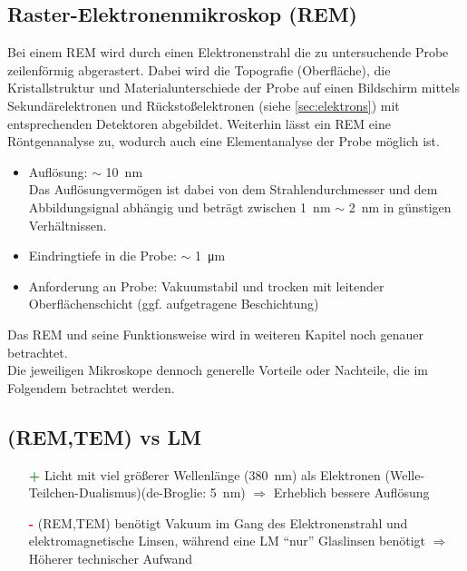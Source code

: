 \subsection*{Raster-Elektronenmikroskop (REM)}
Bei einem REM wird durch einen Elektronenstrahl die zu untersuchende Probe zeilenförmig abgerastert. Dabei wird die Topografie (Oberfläche), die Kristallstruktur und Materialunterschiede der Probe auf einen Bildschirm mittels Sekundärelektronen und Rückstoßelektronen (siehe \ref{sec:elektrons}) mit entsprechenden Detektoren abgebildet. Weiterhin lässt ein REM eine Röntgenanalyse zu, wodurch auch eine Elementanalyse der Probe möglich ist.
\begin{itemize}
    \item Auflösung: $\sim$ \SI{10}{\nano\metre}\\
    Das Auflösungvermögen ist dabei von dem Strahlendurchmesser und dem Abbildungsignal abhängig und beträgt zwischen \SI{1}{\nano\metre} $\sim$ \SI{2}{\nano\metre} in günstigen Verhältnissen. \citep{WikiREM}
    \item Eindringtiefe in die Probe: $\sim$ \SI{1}{\micro\metre}
    \item Anforderung an Probe: Vakuumstabil und trocken mit leitender Oberflächenschicht (ggf. aufgetragene Beschichtung)
\end{itemize}
Das REM und seine Funktionsweise wird in weiteren Kapitel noch genauer betrachtet.\\

Die jeweiligen Mikroskope dennoch generelle Vorteile oder Nachteile, die im Folgendem betrachtet werden.
\subsection*{(REM,TEM) vs LM}
\begin{itemize}
    \item[\textcolor{green}{\textbf{+}}] Licht mit viel größerer Wellenlänge (\SI{380}{\nano\metre}) als Elektronen (Welle-Teilchen-Dualismus)(de-Broglie: \SI{5}{\nano\metre}) $\Rightarrow$ Erheblich bessere Auflösung
    \item[\textcolor{red}{\textbf{-}}] (REM,TEM) benötigt Vakuum im Gang des Elektronenstrahl und elektromagnetische Linsen, während eine LM \enquote{nur} Glaslinsen benötigt $\Rightarrow$ Höherer technischer Aufwand \citep{RuppelEM}
\end{itemize}

